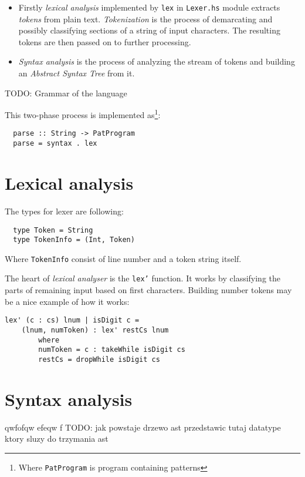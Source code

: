 \documentclass[a4paper]{report}
\begin{document}
\begin{itemize}
  \item Firstly \textit{lexical analysis} implemented by \texttt{lex} in
    \texttt{Lexer.hs} module extracts \textit{tokens} from plain text.
    \textit{Tokenization} is the process of demarcating and possibly
    classifying sections of a string of input characters. The resulting tokens
    are then passed on to further processing.
  \item \textit{Syntax analysis} is the process of analyzing the stream of
    tokens and building an \textit{Abstract Syntax Tree} from it.
\end{itemize}

TODO: Grammar of the language

This two-phase process is implemented as\footnote{Where \texttt{PatProgram}
is program containing patterns}:
\begin{verbatim}
  parse :: String -> PatProgram
  parse = syntax . lex
\end{verbatim}

\section{Lexical analysis}

The types for lexer are following:
\begin{verbatim}
  type Token = String
  type TokenInfo = (Int, Token)
\end{verbatim}
Where \texttt{TokenInfo} consist of line number and a token string itself.

The heart of \textit{lexical analyser} is the \texttt{lex'} function. It works
by classifying the parts of remaining input based on first characters.
Building number tokens may be a nice example of how it works:

\begin{lstlisting}[label=lex_comment,caption={Building tokens from numbers.}]
lex' (c : cs) lnum | isDigit c =
    (lnum, numToken) : lex' restCs lnum
        where
        numToken = c : takeWhile isDigit cs
        restCs = dropWhile isDigit cs
\end{lstlisting}


\section{Syntax analysis}
qwfofqw
efeqw
f
TODO: jak powstaje drzewo ast przedstawic tutaj datatype ktory sluzy do
trzymania ast
\end{document}

